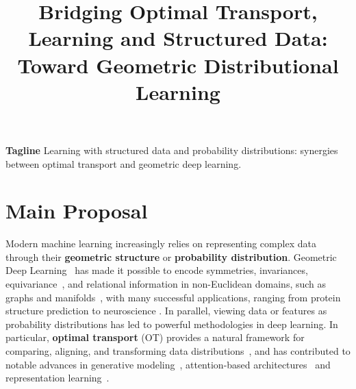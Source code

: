 \documentclass{article}
\title{Bridging Optimal Transport, Learning and Structured Data: Toward Geometric Distributional Learning}
\begin{document}
\maketitle

\vspace*{-1.6cm} %


\textbf{Tagline\;} Learning with structured data and probability distributions: synergies between optimal transport and geometric deep learning.

\section{Main Proposal} %

Modern machine learning increasingly relies on representing complex data through their \textbf{geometric structure} or \textbf{probability distribution}. Geometric Deep Learning~\cite{bronstein2017geometric} has made it possible to encode symmetries, invariances, equivariance~\citep{satorras2021n}, and relational information in non-Euclidean domains, such as graphs and manifolds~\citep{kipf2016semi,bruna2013spectral,velivckovic2017graph,katsman2024riemannian}, with many successful applications, ranging from protein structure prediction to neuroscience \citep{jumper2021highly,lam2022graphcast,bessadok2022graph}. In parallel, viewing data or features as probability distributions has led to powerful methodologies in deep learning. In particular, \textbf{optimal transport} (OT) provides a natural framework for comparing, aligning, and transforming data distributions~\citep{peyre2019computational}, and has contributed to notable advances in generative modeling~\citep{arjovsky2017wasserstein}, attention-based architectures~\citep{castin2024smooth,sander2022sinkformers} and representation learning~\citep{courty2016optimal}. 
\end{document}
